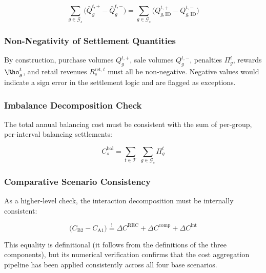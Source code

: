 \documentclass[12pt,a4paper]{article}
\begin{document}
\begin{equation}
\sum_{g \in \mathcal{G}_{s}}
\bigl(\bar{Q}_{g}^{t,+} - \bar{Q}_{g}^{t,-}\bigr)
=
\sum_{g \in \mathcal{G}_{s}}
\bigl(Q_{g,\mathrm{ID}}^{t,+} - Q_{g,\mathrm{ID}}^{t,-}\bigr)
\label{eq:contracted_check}
\end{equation}

\subsubsection{Non-Negativity of Settlement Quantities}

By construction, purchase volumes $Q_{g}^{t,+}$, sale volumes $Q_{g}^{t,-}$,
penalties $\Pi_{g}^{t}$, rewards $\Rho_{g}^{t}$, and retail revenues
$R_{s}^{\mathrm{ret},t}$ must all be non-negative.  Negative values would
indicate a sign error in the settlement logic and are flagged as exceptions.

\subsubsection{Imbalance Decomposition Check}

The total annual balancing cost must be consistent with the sum of per-group,
per-interval balancing settlements:

\begin{equation}
C_{s}^{\mathrm{bal}}
= \sum_{t \in \mathcal{T}}\;\sum_{g \in \mathcal{G}_{s}} \Pi_{g}^{t}
\label{eq:bal_cost_check}
\end{equation}

\subsubsection{Comparative Scenario Consistency}

As a higher-level check, the interaction decomposition must be internally
consistent:

\begin{equation}
\bigl(C_{\text{B2}} - C_{\text{A1}}\bigr)
\stackrel{!}{=}
\Delta C^{\mathrm{REC}} + \Delta C^{\mathrm{comp}} + \Delta C^{\mathrm{int}}
\label{eq:interaction_check}
\end{equation}

This equality is definitional (it follows from the definitions of the three
components), but its numerical verification confirms that the cost aggregation
pipeline has been applied consistently across all four base scenarios.

\end{document}
